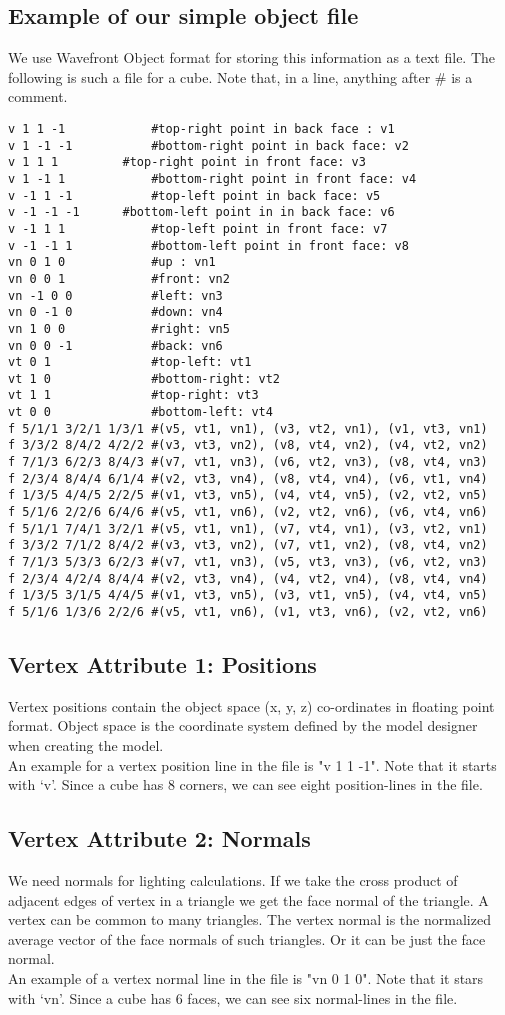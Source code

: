 \subsection{Example of our simple object file}
We use Wavefront Object format for storing this information as a text file. The following is such a file for a cube. Note that, in a line, anything after \# is a comment. 
\lstset{style=general}
\begin{lstlisting}
v 1 1 -1			#top-right point in back face : v1
v 1 -1 -1			#bottom-right point in back face: v2
v 1 1 1			#top-right point in front face: v3
v 1 -1 1			#bottom-right point in front face: v4
v -1 1 -1			#top-left point in back face: v5
v -1 -1 -1		#bottom-left point in in back face: v6
v -1 1 1			#top-left point in front face: v7
v -1 -1 1			#bottom-left point in front face: v8
vn 0 1 0			#up : vn1
vn 0 0 1			#front: vn2
vn -1 0 0			#left: vn3
vn 0 -1 0			#down: vn4
vn 1 0 0			#right: vn5
vn 0 0 -1			#back: vn6
vt 0 1				#top-left: vt1
vt 1 0				#bottom-right: vt2
vt 1 1				#top-right: vt3
vt 0 0				#bottom-left: vt4
f 5/1/1 3/2/1 1/3/1 #(v5, vt1, vn1), (v3, vt2, vn1), (v1, vt3, vn1)
f 3/3/2 8/4/2 4/2/2 #(v3, vt3, vn2), (v8, vt4, vn2), (v4, vt2, vn2)
f 7/1/3 6/2/3 8/4/3 #(v7, vt1, vn3), (v6, vt2, vn3), (v8, vt4, vn3)
f 2/3/4 8/4/4 6/1/4 #(v2, vt3, vn4), (v8, vt4, vn4), (v6, vt1, vn4)
f 1/3/5 4/4/5 2/2/5 #(v1, vt3, vn5), (v4, vt4, vn5), (v2, vt2, vn5)
f 5/1/6 2/2/6 6/4/6 #(v5, vt1, vn6), (v2, vt2, vn6), (v6, vt4, vn6)
f 5/1/1 7/4/1 3/2/1 #(v5, vt1, vn1), (v7, vt4, vn1), (v3, vt2, vn1)
f 3/3/2 7/1/2 8/4/2 #(v3, vt3, vn2), (v7, vt1, vn2), (v8, vt4, vn2)
f 7/1/3 5/3/3 6/2/3 #(v7, vt1, vn3), (v5, vt3, vn3), (v6, vt2, vn3)
f 2/3/4 4/2/4 8/4/4 #(v2, vt3, vn4), (v4, vt2, vn4), (v8, vt4, vn4)
f 1/3/5 3/1/5 4/4/5 #(v1, vt3, vn5), (v3, vt1, vn5), (v4, vt4, vn5)
f 5/1/6 1/3/6 2/2/6 #(v5, vt1, vn6), (v1, vt3, vn6), (v2, vt2, vn6)

\end{lstlisting}
\subsection{Vertex Attribute 1: Positions}
Vertex positions contain the object space (x, y, z) co-ordinates in floating point format. Object space is the coordinate system defined by the model designer when creating the model.\\An example for a vertex position line in the file is "v 1 1 -1". Note that it starts with `v'. Since a cube has 8 corners, we can see eight position-lines in the file.
\subsection{Vertex Attribute 2: Normals}
We need normals for lighting calculations.
If we take the cross product of adjacent edges of vertex in a triangle we get the face normal of the
triangle. A vertex can be common to many triangles. The vertex normal is the normalized average vector
of the face normals of such triangles. Or it can be just the face normal. \\An example of a vertex normal line in the file is "vn 0 1 0". Note that it stars with `vn'.  Since a cube has 6 faces, we can see six normal-lines in the file.
